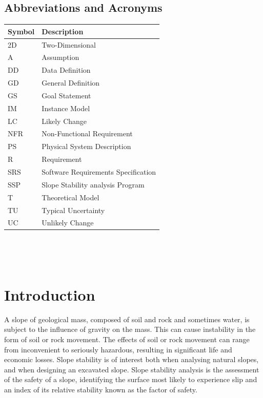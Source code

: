 \documentclass[12pt]{article}
\newcommand{\progname}{SSP}
\renewcommand{\arraystretch}{1}
\begin{document}
\renewcommand{\arraystretch}{1}

\subsection{Abbreviations and Acronyms}

\renewcommand{\arraystretch}{1.2}
\begin{tabular}{l l} 
  \toprule		
  \textbf{Symbol} & \textbf{Description}\\
  \midrule 
  2D & Two-Dimensional\\
  A & Assumption\\
  DD & Data Definition\\
  GD & General Definition\\
  GS & Goal Statement\\
  IM & Instance Model\\
  LC & Likely Change\\
  NFR & Non-Functional Requirement\\
  PS & Physical System Description\\
  R & Requirement\\
  SRS & Software Requirements Specification\\
  \progname\ & Slope Stability analysis Program\\
  T & Theoretical Model\\
  TU & Typical Uncertainty\\
  UC & Unlikely Change\\
  \bottomrule
\end{tabular}\\

\newpage

\tableofcontents

~\newpage


\setlength{\tabcolsep}{6pt}

\section{Introduction}

A slope of geological mass, composed of soil and rock and sometimes water, is 
subject to the influence of gravity on the mass. This can cause instability in 
the form of soil or rock movement. The effects of soil or rock movement can 
range from inconvenient to seriously hazardous, resulting in significant life 
and economic losses. Slope stability is of interest both when analysing natural 
slopes, and when designing an excavated slope. Slope stability analysis is the 
assessment of the safety of a slope, identifying the surface most likely to 
experience slip and an index of its relative stability known as the factor of 
safety.
\end{document}

